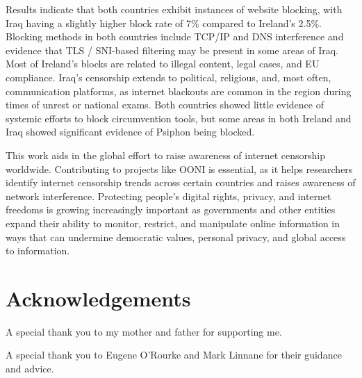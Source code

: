 \documentclass[a4paper,oneside,12pt]{book}
\begin{document}
Results indicate that both countries exhibit instances of website blocking, with Iraq having a slightly higher block rate of 7\% compared to Ireland's 2.5\%. Blocking methods in both countries include TCP/IP and DNS interference and evidence that TLS / SNI-based filtering may be present in some areas of Iraq. Most of Ireland's blocks are related to illegal content, legal cases, and EU compliance. Iraq's censorship extends to political, religious, and, most often, communication platforms, as internet blackouts are common in the region during times of unrest or national exams. Both countries showed little evidence of systemic efforts to block circumvention tools, but some areas in both Ireland and Iraq showed significant evidence of Psiphon being blocked.

This work aids in the global effort to raise awareness of internet censorship worldwide. Contributing to projects like OONI is essential, as it helps researchers identify internet censorship trends across certain countries and raises awareness of network interference. Protecting people's digital rights, privacy, and internet freedoms is growing increasingly important as governments and other entities expand their ability to monitor, restrict, and manipulate online information in ways that can undermine democratic values, personal privacy, and global access to information.



\newpage
\raggedright %

\section*{\Huge{Acknowledgements}}

A special thank you to my mother and father for supporting me.

A special thank you to Eugene O'Rourke and Mark Linnane for their guidance and advice.

\newpage \tableofcontents
\end{document}
